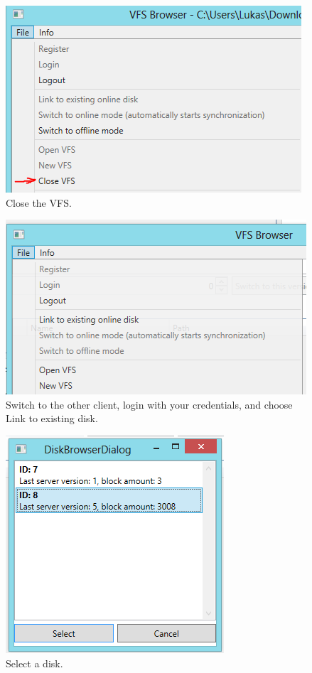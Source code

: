 \documentclass[JCDReport.tex]{subfiles}
\begin{document}
\begin{figure}[h!]
	\centering
	\includegraphics[scale=1]{Images/tutorial/15.png} 
	\caption{Close the VFS.}
\end{figure}

\begin{figure}[h!]
	\centering
	\includegraphics[scale=1]{Images/tutorial/12.png} 
	\caption{Switch to the other client, login with your credentials, and choose Link to existing disk.}
\end{figure}

\begin{figure}[h!]
	\centering
	\includegraphics[scale=1]{Images/tutorial/13.png} 
	\caption{Select a disk.}
\end{figure}
\end{document}
